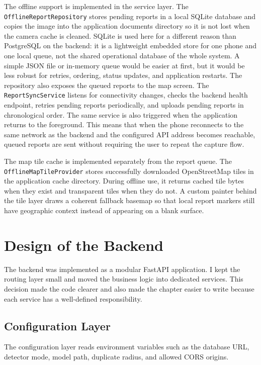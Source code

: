 The offline support is implemented in the service layer. The \texttt{Offline\allowbreak Report\allowbreak Repository} stores pending reports in a local SQLite database and copies the image into the application documents directory so it is not lost when the camera cache is cleaned. SQLite is used here for a different reason than PostgreSQL on the backend: it is a lightweight embedded store for one phone and one local queue, not the shared operational database of the whole system. A simple JSON file or in-memory queue would be easier at first, but it would be less robust for retries, ordering, status updates, and application restarts. The repository also exposes the queued reports to the map screen. The \texttt{Report\allowbreak Sync\allowbreak Service} listens for connectivity changes, checks the backend health endpoint, retries pending reports periodically, and uploads pending reports in chronological order. The same service is also triggered when the application returns to the foreground. This means that when the phone reconnects to the same network as the backend and the configured API address becomes reachable, queued reports are sent without requiring the user to repeat the capture flow.

The map tile cache is implemented separately from the report queue. The \texttt{Offline\allowbreak Map\allowbreak Tile\allowbreak Provider} stores successfully downloaded OpenStreetMap tiles in the application cache directory. During offline use, it returns cached tile bytes when they exist and transparent tiles when they do not. A custom painter behind the tile layer draws a coherent fallback basemap so that local report markers still have geographic context instead of appearing on a blank surface.

\section{Design of the Backend}

The backend was implemented as a modular FastAPI application. I kept the routing layer small and moved the business logic into dedicated services. This decision made the code clearer and also made the chapter easier to write because each service has a well-defined responsibility.

\subsection{Configuration Layer}

The configuration layer reads environment variables such as the database URL, detector mode, model path, duplicate radius, and allowed CORS origins.

